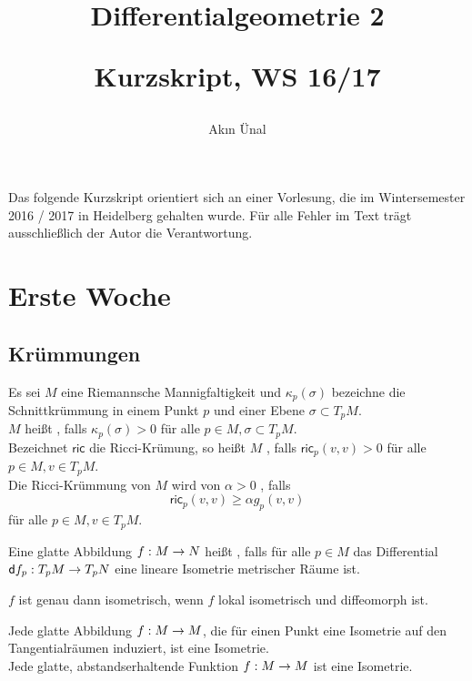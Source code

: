 \documentclass{book}
\renewcommand{\d}{\textsf{d}}
\newcommand{\ric}{\textsf{ric}}
\begin{document}
\title{
\begin{huge}
Differentialgeometrie 2\\
\end{huge}
\begin{large}
Kurzskript, WS 16/17
\end{large}}


\author{Ak\i{}n Ünal}
\maketitle
\renewcommand{\i}{^{-1}}

Das folgende Kurzskript orientiert sich an einer Vorlesung, die im Wintersemester 2016 / 2017 in 
Heidelberg gehalten wurde. Für alle Fehler im Text trägt ausschließlich der Autor die Verantwortung.

\setcounter{tocdepth}{1}
\tableofcontents


\chapter{Erste Woche}
\section{Krümmungen}

\Def{}
Es sei $M$ eine Riemannsche Mannigfaltigkeit und $\kappa_p(\sigma)$ bezeichne die Schnittkrümmung in einem Punkt $p$ und einer Ebene $\sigma \subset T_pM$.\\
$M$ heißt , falls $\kappa_p(\sigma) > 0$ für alle $p \in M, \sigma \subset T_pM$.\\
Bezeichnet $\ric$ die Ricci-Krümung, so heißt $M$ , falls $\ric_p(v,v) > 0$ für alle $p \in M, v \in T_pM$.\\
Die Ricci-Krümmung von $M$ wird von $\alpha > 0$ , falls
\[ \ric_p(v,v) \geq \alpha g_p(v,v) \]
für alle $p \in M, v \in T_pM$.

Eine glatte Abbildung $f : M \overset{}{\rightarrow} N$ heißt , falls für alle $p \in M$ das Differential $\d f_p : T_pM \pfeil{} T_pN$ eine lineare Isometrie metrischer Räume ist.

\Bem{}
$f$ ist genau dann isometrisch, wenn $f$ lokal isometrisch und diffeomorph ist.

\Satz{}
Jede glatte Abbildung $f : M \overset{}{\rightarrow} M$, die für einen Punkt eine Isometrie auf den Tangentialräumen induziert, ist eine Isometrie.\\
Jede glatte, abstandserhaltende Funktion $f : M \overset{}{\rightarrow} M$ ist eine Isometrie.
\end{document}
